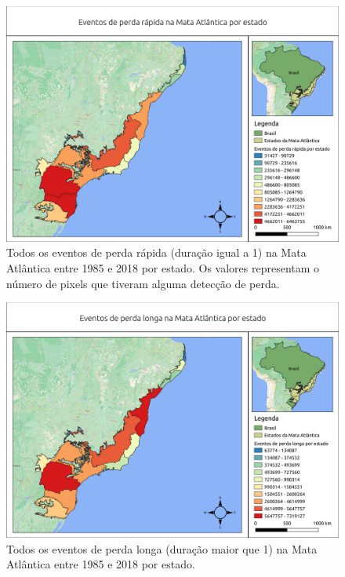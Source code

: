 \begin{figure}[H]
    \centering
    \includegraphics[scale=.5]{images/estados_loss_masked85_maskedGain_eq1.pdf}
    \caption{Todos os eventos de perda rápida (duração igual a 1) na Mata Atlântica entre 1985 e 2018 por estado. Os valores representam o número de pixels que tiveram alguma detecção de perda.}
    \label{fig:estados_loss_masked85_maskedgain_eq1}
\end{figure}

\begin{figure}[H]
    \centering
    \includegraphics[scale=.5]{images/estados_loss_masked85_maskedGain_neq1.pdf}
    \caption{Todos os eventos de perda longa (duração maior que 1) na Mata Atlântica entre 1985 e 2018 por estado.}
    \label{fig:estados_loss_masked85_maskedgain_neq1}
\end{figure}

